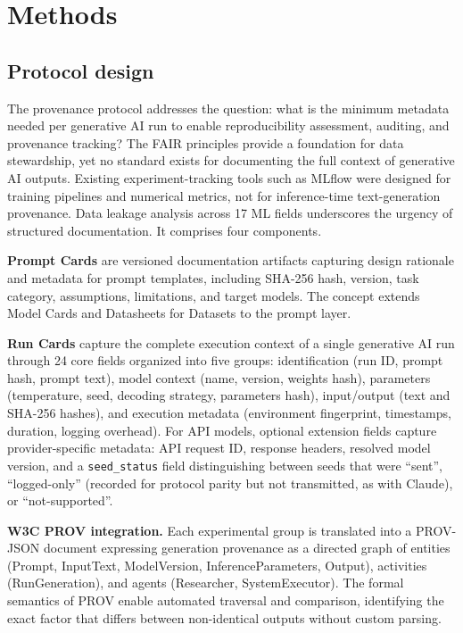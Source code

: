\documentclass[sn-nature]{sn-jnl}
\begin{document}
\section{Methods}\label{sec:methods}

\subsection{Protocol design}\label{subsec:protocol}

The provenance protocol addresses the question: what is the minimum metadata needed per generative AI run to enable reproducibility assessment, auditing, and provenance tracking?
The FAIR principles\cite{wilkinson2016fair} provide a foundation for data stewardship, yet no standard exists for documenting the full context of generative AI outputs.
Existing experiment-tracking tools such as MLflow\cite{zaharia2018accelerating} were designed for training pipelines and numerical metrics, not for inference-time text-generation provenance.
Data leakage analysis across 17 ML fields\cite{kapoor2023leakage} underscores the urgency of structured documentation.
It comprises four components.

\textbf{Prompt Cards} are versioned documentation artifacts capturing design rationale and metadata for prompt templates, including SHA-256 hash, version, task category, assumptions, limitations, and target models.
The concept extends Model Cards\cite{mitchell2019model} and Datasheets for Datasets\cite{gebru2021datasheets} to the prompt layer.

\textbf{Run Cards} capture the complete execution context of a single generative AI run through 24 core fields organized into five groups: identification (run ID, prompt hash, prompt text), model context (name, version, weights hash), parameters (temperature, seed, decoding strategy, parameters hash), input/output (text and SHA-256 hashes), and execution metadata (environment fingerprint, timestamps, duration, logging overhead).
For API models, optional extension fields capture provider-specific metadata: API request ID, response headers, resolved model version, and a \texttt{seed\_status} field distinguishing between seeds that were ``sent'', ``logged-only'' (recorded for protocol parity but not transmitted, as with Claude), or ``not-supported''.

\textbf{W3C PROV integration.}
Each experimental group is translated into a PROV-JSON document\cite{w3cprov2013} expressing generation provenance as a directed graph of entities (Prompt, InputText, ModelVersion, InferenceParameters, Output), activities (RunGeneration), and agents (Researcher, SystemExecutor).
The formal semantics of PROV enable automated traversal and comparison, identifying the exact factor that differs between non-identical outputs without custom parsing.
\end{document}
